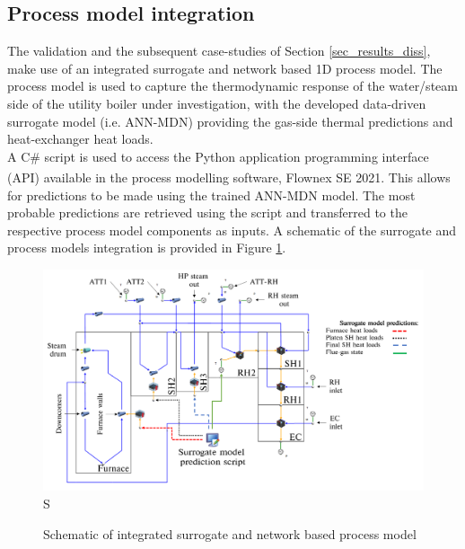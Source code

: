 \documentclass[a4paper,fleqn]{cas-dc}
\begin{document}
\subsection{Process model integration}
The validation and the subsequent case-studies of Section \ref{sec_results_diss}, make use of an integrated surrogate and network based 1D process model. The process model is used to capture the thermodynamic response of the water/steam side of the utility boiler under investigation, with the developed data-driven surrogate model (i.e. ANN-MDN) providing the gas-side thermal predictions and heat-exchanger heat loads.\\

A C\# script is used to access the Python application programming interface (API) available in the process modelling software, Flownex SE\textsuperscript{\textregistered} 2021. This allows for predictions to be made using the trained ANN-MDN model. The most probable predictions are retrieved using the script and transferred to the respective process model components as inputs. A schematic of the surrogate and process models integration is provided in Figure \ref{fig_int_model}.\\
\begin{figure}[h!]
	\centering
		\includegraphics[scale=0.15]{INTEGRATED_MODEL}S
	  \caption{Schematic of integrated surrogate and network based process model}\label{fig_int_model}
\end{figure}
\end{document}
